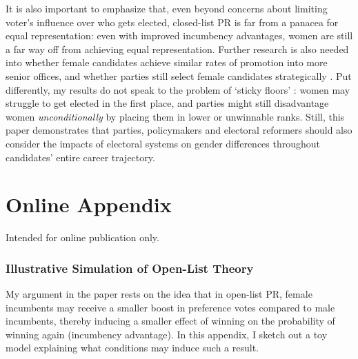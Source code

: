 \documentclass[12pt]{article}
\begin{document}
It is also important to emphasize that, even beyond concerns about limiting voter's influence over who gets elected, closed-list PR is far from a panacea for equal representation: even with improved incumbency advantages, women are still a far way off from achieving equal representation. Further research is also needed into whether female candidates achieve similar rates of promotion into more senior offices, and whether parties still select female candidates strategically \citep{verge2019parties}. Put differently, my results do not speak to the problem of `sticky floors' \citep{cipullo2021}: women may struggle to get elected in the first place, and parties might still disadvantage women \emph{unconditionally} by placing them in lower or unwinnable ranks. Still, this paper demonstrates that parties, policymakers and electoral reformers should also consider the impacts of electoral systems on gender differences throughout candidates' entire career trajectory.


\singlespacing

\setlength\bibsep{3pt}
\renewcommand*{\bibfont}{\small}





\clearpage

\appendix
{}
\renewcommand{\thetable}{\Alph{section}\arabic{table}}
\renewcommand{\thefigure}{\Alph{section}\arabic{figure}}
\setcounter{page}{1}

\part{Online Appendix} %

Intended for online publication only.

\parttoc %

\pagebreak

\section{Illustrative Simulation of Open-List Theory}
\label{app:theorysim}

My argument in the paper rests on the idea that in open-list PR, female incumbents may receive a smaller boost in preference votes compared to male incumbents, thereby inducing a smaller effect of winning on the probability of winning again (incumbency advantage). In this appendix, I sketch out a toy model explaining what conditions may induce such a result.
\end{document}
